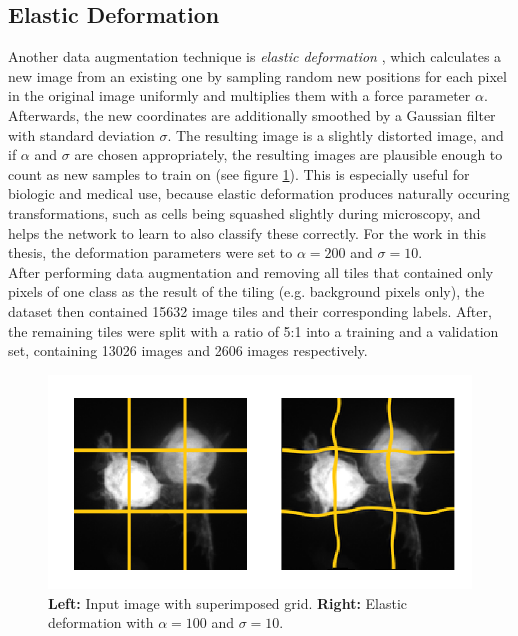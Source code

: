 		\subsection{Elastic Deformation}
Another data augmentation technique is \textit{elastic deformation} \cite{elastic}, which calculates a new image from an existing one by sampling random new positions for each pixel in the original image uniformly and multiplies them with a force parameter $\alpha$. Afterwards, the new coordinates are additionally smoothed by a Gaussian filter with standard deviation $\sigma$. The resulting image is a slightly distorted image, and if $\alpha$ and $\sigma$ are chosen appropriately, the resulting images are plausible enough to count as new samples to train on (see figure \ref{fig:elastic}). This is especially useful for biologic and medical use, because elastic deformation produces naturally occuring transformations, such as cells being squashed slightly during microscopy, and helps the network to learn to also classify these correctly. For the work in this thesis, the deformation parameters were set to $\alpha = 200$ and $\sigma = 10$.\\

\noindent After performing data augmentation and removing all tiles that contained only pixels of one class as the result of the tiling (e.g. background pixels only), the dataset then contained 15632 image tiles and their corresponding labels. After, the remaining tiles were split with a ratio of 5:1 into a training and a validation set, containing 13026 images and 2606 images respectively.



\begin {figure}[!ht]
	\begin{center}
		\includegraphics[scale=0.80]{img/fig_elastic.png}
	\end{center}
	\caption[]{\textbf{Left:} Input image with superimposed grid. \textbf{Right:} Elastic deformation with $\alpha = 100$ and $\sigma = 10$.}
	\label{fig:elastic}
\end {figure}



